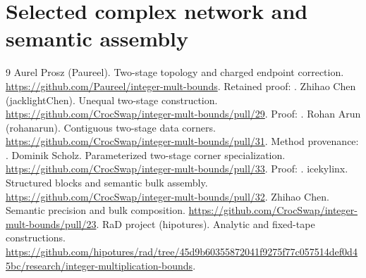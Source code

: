 \documentclass[11pt]{article}
\begin{document}
\section{Selected complex network and semantic assembly}



\begin{thebibliography}{9}
 Aurel Prosz (Paureel). Two-stage topology and charged
endpoint correction. \url{https://github.com/Paureel/integer-mult-bounds}.
Retained proof: .
 Zhihao Chen (jacklightChen). Unequal two-stage construction.
\url{https://github.com/CrocSwap/integer-mult-bounds/pull/29}.
Proof: .
 Rohan Arun (rohanarun). Contiguous two-stage data corners.
\url{https://github.com/CrocSwap/integer-mult-bounds/pull/31}.
Method provenance: .
 Dominik Scholz. Parameterized two-stage corner specialization.
\url{https://github.com/CrocSwap/integer-mult-bounds/pull/33}.
Proof: .
 icekylinx. Structured blocks and semantic bulk assembly.
\url{https://github.com/CrocSwap/integer-mult-bounds/pull/32}.
 Zhihao Chen. Semantic precision and bulk composition.
\url{https://github.com/CrocSwap/integer-mult-bounds/pull/23}.
 RaD project (hipotures). Analytic and fixed-tape constructions.
\url{https://github.com/hipotures/rad/tree/45d9b60355872041f9275f77c057514def0d45bc/research/integer-multiplication-bounds}.
\end{thebibliography}
\end{document}
